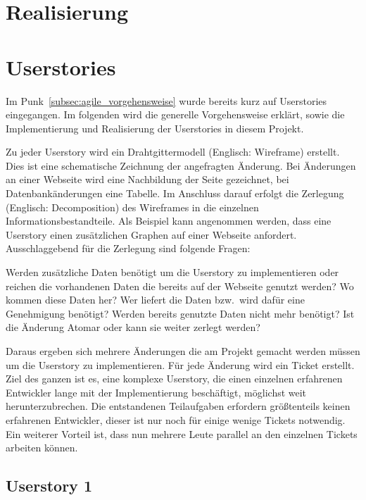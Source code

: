 \section{Realisierung}

\section{Userstories}
Im Punk~\ref{subsec:agile_vorgehensweise} wurde bereits kurz auf Userstories
eingegangen. Im folgenden wird die generelle Vorgehensweise erklärt, sowie die
Implementierung und Realisierung der Userstories in diesem Projekt.

Zu jeder Userstory wird ein Drahtgittermodell (Englisch: Wireframe) erstellt.
Dies ist eine schematische Zeichnung der angefragten Änderung. Bei Änderungen
an einer Webseite wird eine Nachbildung der Seite gezeichnet, bei
Datenbankänderungen eine Tabelle. Im Anschluss darauf erfolgt die Zerlegung
(Englisch: Decomposition) des Wireframes in die einzelnen
Informationsbestandteile. Als Beispiel kann angenommen werden, dass eine
Userstory einen zusätzlichen Graphen auf einer Webseite anfordert.
Ausschlaggebend für die Zerlegung sind folgende Fragen:

\begin{outline}
  \1 Werden zusätzliche Daten benötigt um die Userstory zu implementieren oder
  reichen die vorhandenen Daten die bereits auf der Webseite genutzt werden?
  \1 Wo kommen diese Daten her?
  \1 Wer liefert die Daten bzw.\ wird dafür eine Genehmigung benötigt?
  \1 Werden bereits genutzte Daten nicht mehr benötigt?
  \1 Ist die Änderung Atomar oder kann sie weiter zerlegt werden?
\end{outline}

Daraus ergeben sich mehrere Änderungen die am Projekt gemacht werden müssen um
die Userstory zu implementieren. Für jede Änderung wird ein Ticket erstellt.
Ziel des ganzen ist es, eine komplexe Userstory, die einen einzelnen
erfahrenen Entwickler lange mit der Implementierung beschäftigt, möglichst weit
herunterzubrechen. Die entstandenen Teilaufgaben erfordern größtenteils keinen
erfahrenen Entwickler, dieser ist nur noch für einige wenige Tickets notwendig.
Ein weiterer Vorteil ist, dass nun mehrere Leute parallel an den einzelnen
Tickets arbeiten können.
\tm%

\subsection{Userstory 1}


